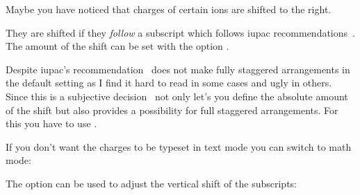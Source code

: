 \documentclass[load-preamble+]{cnltx-doc}
\begin{document}
Maybe you have noticed that charges of certain ions are shifted to the
right.
\begin{example}
    
\end{example}
They are shifted if they \emph{follow} a subscript which follows \ac{iupac}
recommendations~\cite[][p.\,51]{iupac:greenbook}.  The amount of the shift can
be set with the option .
\begin{example}
     \par
     \par
    
\end{example}

Despite \ac{iupac}'s recommendation \chemformula\ does not make fully staggered
arrangements in the default setting as I find it hard to read in some cases
and ugly in others.  Since this is a subjective decision \chemformula\ not only
let's you define the absolute amount of the shift but also provides a
possibility for full staggered arrangements.  For this you have to use
.
\begin{example}
    \par
    \par
    \par
   
\end{example}

If you don't want the charges to be typeset in text mode you can switch to
math mode:
\begin{example}
    \par
   
\end{example}

The option  can be used to adjust the vertical shift
of the subscripts:
\begin{example}
    \par
    \par
   
\end{example}
\end{document}
